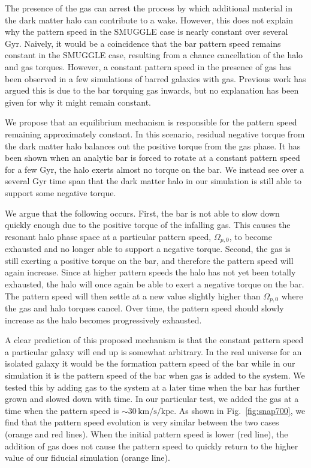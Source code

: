 \documentclass{natureprintstyle}
\begin{document}
The presence of the gas can arrest the process by which additional material in
the dark matter halo can contribute to a wake. However, this does not explain
why the pattern speed in the SMUGGLE case is nearly constant over several Gyr.
Naively, it would be a coincidence that the bar pattern speed remains constant
in the SMUGGLE case, resulting from a chance cancellation of the halo and gas
torques. However, a constant pattern speed in the presence of gas has been
observed in a few simulations of barred galaxies with
gas.\cite{1993AA...268...65F, 2010ApJ...719.1470V} Previous work has argued
this is due to the bar torquing gas inwards, but no explanation has been given
for why it might remain constant.

We propose that an equilibrium mechanism is responsible for the pattern speed
remaining approximately constant. In this scenario, residual negative torque
from the dark matter halo balances out the positive torque from the gas phase.
It has been shown when an analytic bar is forced to rotate at a constant
pattern speed for a few Gyr, the halo exerts almost no torque on the
bar.\cite{2022MNRAS.513..768C} We instead see over a several Gyr time span
that the dark matter halo in our simulation is still able to support some
negative torque.

We argue that the following occurs. First, the bar is not able to slow down
quickly enough due to the positive torque of the infalling gas. This causes
the resonant halo phase space at a particular pattern speed, $\Omega_{p,0}$,
to become exhausted and no longer able to support a negative torque. Second,
the gas is still exerting a positive torque on the bar, and therefore the
pattern speed will again increase. Since at higher pattern speeds the halo has
not yet been totally exhausted, the halo will once again be able to exert a
negative torque on the bar. The pattern speed will then settle at a new value
slightly higher than $\Omega_{p,0}$ where the gas and halo torques cancel.
Over time, the pattern speed should slowly increase as the halo becomes
progressively exhausted.

A clear prediction of this proposed mechanism is that the constant pattern
speed a particular galaxy will end up is somewhat arbitrary. In the real
universe for an isolated galaxy it would be the formation pattern speed of the
bar while in our simulation it is the pattern speed of the bar when gas is
added to the system. We tested this by adding gas to the system at a later
time when the bar has further grown and slowed down with time. In our
particular test, we added the gas at a time when the pattern speed is
$\sim30\,\textrm{km}/\textrm{s}/\textrm{kpc}$. As shown in
Fig.~\ref{fig:snap700}, we find that the pattern speed evolution is very
similar between the two cases (orange and red lines). When the initial pattern
speed is lower (red line), the addition of gas does not cause the pattern
speed to quickly return to the higher value of our fiducial simulation (orange
line). 
\end{document}
